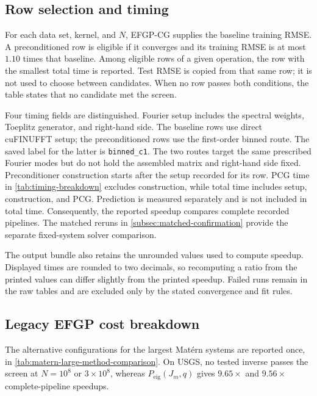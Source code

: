 \subsection{Row selection and timing}

For each data set, kernel, and \(N\), EFGP-CG supplies the baseline training
RMSE. A preconditioned row is eligible if it converges and its training RMSE
is at most \(1.10\) times that baseline. Among eligible rows of a given
operation, the row with the smallest total time is reported. Test RMSE is
copied from that same row; it is not used to choose between candidates. When
no row passes both conditions, the table states that no candidate met the
screen.

Four timing fields are distinguished. Fourier setup includes the spectral
weights, Toeplitz generator, and right-hand side. The baseline rows use direct
cuFINUFFT setup; the preconditioned rows use the first-order binned route. The
saved label for the latter is \texttt{binned\_c1}. The
two routes target the same prescribed Fourier modes but do not hold the
assembled matrix and right-hand side fixed. Preconditioner construction starts after the
setup recorded for its row. PCG time in \cref{tab:timing-breakdown}
excludes construction, while total time includes setup, construction, and
PCG. Prediction is measured separately and is not included in total time.
Consequently, the reported speedup compares complete recorded pipelines. The
matched reruns in \cref{subsec:matched-confirmation} provide the separate
fixed-system solver comparison.

The output bundle also retains the unrounded values used to compute speedup.
Displayed times are rounded to two decimals, so recomputing a ratio from the
printed values can differ slightly from the printed speedup. Failed runs remain
in the raw tables and are excluded only by the stated convergence and fit
rules.

\subsection{Legacy EFGP cost breakdown}
\label{subsec:timing-breakdown}

The alternative configurations for the largest Mat\'ern systems are reported
once, in \cref{tab:matern-large-method-comparison}. On USGS, no tested inverse
passes the screen at \(N=10^8\) or \(3\times10^8\), whereas
\(P_{\mathrm{eig}}(J_m,q)\) gives \(9.65\times\) and \(9.56\times\)
complete-pipeline speedups.

